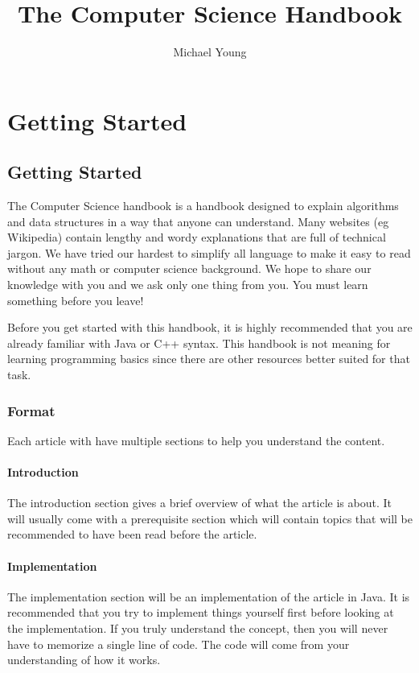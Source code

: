 \documentclass[11pt,oneside]{book}
\title{The Computer Science Handbook}
\author{Michael Young}
\begin{document}
		\maketitle
		\tableofcontents
		\chapter{ Getting Started }
    \section{ Getting Started }
    

The Computer Science handbook is a handbook designed to explain algorithms and data structures in a way that anyone can understand. Many websites (eg Wikipedia) contain lengthy and wordy explanations that are full of technical jargon. We have tried our hardest to simplify all language to make it easy to read without any math or computer science background. We hope to share our knowledge with you and we ask only one thing from you. You must learn something before you leave!

Before you get started with this handbook, it is highly recommended that you are already familiar with Java or C++ syntax. This handbook is not meaning for learning programming basics since there are other resources better suited for that task.

\subsection{Format}

Each article with have multiple sections to help you understand the content.

\subsubsection{Introduction}

The introduction section gives a brief overview of what the article is about. It will usually come with a prerequisite section which will contain topics that will be recommended to have been read before the article.

\subsubsection{Implementation}

The implementation section will be an implementation of the article in Java. It is recommended that you try to implement things yourself first before looking at the implementation. If you truly understand the concept, then you will never have to memorize a single line of code. The code will come from your understanding of how it works.
\end{document}
